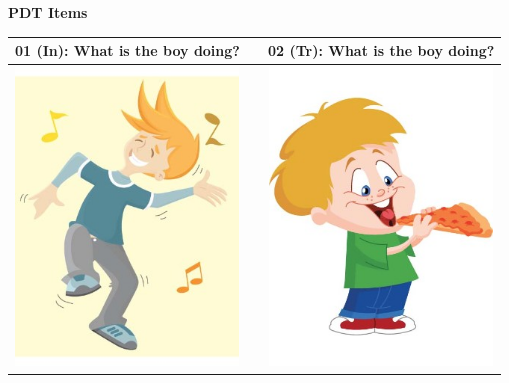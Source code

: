 \documentclass[12pt,notitlepage]{article}
\date{}
\begin{document}

\begin{center}

{\Large \textbf{PDT Items}}

\vspace{2em}

\begin{tabular}{|c|c|c|}
\hline
01 (In): What is the boy doing? && 02 (Tr): What is the boy doing? \\
\hline
\includegraphics[width=16em,trim=0 0 0 -3]{figures/I01.jpg} & & \includegraphics[width=16em,trim=0 0 0 -3]{figures/I02.jpg} \\
\hline
\end{tabular}
\vspace{1em} \\



\end{center}
\end{document}
